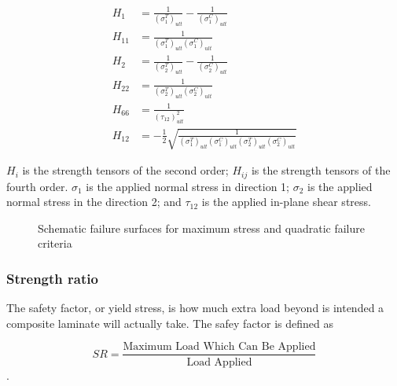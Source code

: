 \begin{equation}
	\begin{split}
		H_{1}&=\frac{1}{\left(\sigma_{1}^{T}\right)_{u l t}}-\frac{1}{\left(\sigma_{1}^{C}\right)_{u l t}} \\
		H_{11}&=\frac{1}{\left(\sigma_{1}^{T}\right)_{u l t}\left(\sigma_{1}^{C}\right)_{u l t}} \\
		H_{2}&=\frac{1}{\left(\sigma_{2}^{T}\right)_{u l t}}-\frac{1}{\left(\sigma_{2}^{C}\right)_{u l t}} \\
		H_{22}&=\frac{1}{\left(\sigma_{2}^{T}\right)_{u l t}\left(\sigma_{2}^{C}\right)_{u l t}} \\
		H_{66}&=\frac{1}{\left(\tau_{12}\right)_{u l t}^{2}} \\
		H_{12}&=-\frac{1}{2} \sqrt{\frac{1}{\left(\sigma_{1}^{T}\right)_{u l
		t}\left(\sigma_{1}^{C}\right)_{u l t}\left(\sigma_{2}^{T}\right)_{u l
		t}\left(\sigma_{2}^{C}\right)_{u l t}}}
	\end{split}
\end{equation}

$H_i$ is the strength tensors of the second order; $H_{ij}$ is the strength
tensors of the fourth order. $\sigma_1$ is the applied normal stress in 
direction 1; $\sigma_2$ is the applied normal stress in the direction 2; and
$\tau_{12}$ is the applied in-plane shear stress.





\begin{figure}
\centering
{}
\caption{Schematic failure surfaces for maximum stress and quadratic failure
criteria}
\end{figure}


\subsubsection{Strength ratio}
The safety factor, or yield stress, is how much extra load beyond is intended a
composite laminate will actually take. The safey factor is defined as 

\begin{equation} \label{eq:sr}S R=\frac{\text {Maximum Load Which Can Be Applied}}{\text {Load Applied}}
\end{equation}.
